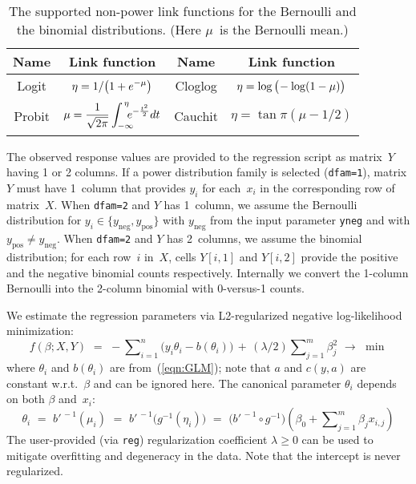 \begin{table}[t]\hfil
\begin{tabular}{|cc|cc|}
\hline
Name & Link function & Name & Link function \\
\hline
Logit   & $\displaystyle \eta = 1 / \big(1 + e^{-\mu}\big)^{\mathstrut}$ &
Cloglog & $\displaystyle \eta = \log \big(\!- \log(1 - \mu)\big)^{\mathstrut}$ \\
Probit  & $\displaystyle \mu  = \frac{1}{\sqrt{2\pi}}\int\nolimits_{-\infty_{\mathstrut}}^{\,\eta\mathstrut}
          \!\!\!\!\! e^{-\frac{t^2}{2}} dt$ & 
Cauchit & $\displaystyle \eta = \tan\pi(\mu - 1/2)$ \\
\hline
\end{tabular}\hfil
\caption{The supported non-power link functions for the Bernoulli and the binomial
distributions.  (Here $\mu$~is the Bernoulli mean.)}
\label{table:binomial_links}
\end{table}

The observed response values are provided to the regression script as matrix~$Y$
having 1 or 2 columns.  If a power distribution family is selected ({\tt dfam=1}),
matrix $Y$ must have 1~column that provides $y_i$ for each~$x_i$ in the corresponding
row of matrix~$X$.  When {\tt dfam=2} and $Y$ has 1~column, we assume the Bernoulli
distribution for $y_i\in\{y_{\mathrm{neg}}, y_{\mathrm{pos}}\}$ with $y_{\mathrm{neg}}$
from the input parameter {\tt yneg} and with $y_{\mathrm{pos}} \neq y_{\mathrm{neg}}$.  
When {\tt dfam=2} and $Y$ has 2~columns, we assume the
binomial distribution; for each row~$i$ in~$X$, cells $Y[i, 1]$ and $Y[i, 2]$ provide
the positive and the negative binomial counts respectively.  Internally we convert
the 1-column Bernoulli into the 2-column binomial with 0-versus-1 counts.

We estimate the regression parameters via L2-regularized negative log-likelihood
minimization:
\begin{equation*}
f(\beta; X, Y) \,\,=\,\, -\sum\nolimits_{i=1}^n \big(y_i\theta_i - b(\theta_i)\big)
\,+\,(\lambda/2) \sum\nolimits_{j=1}^m \beta_j^2\,\,\to\,\,\min
\end{equation*}
where $\theta_i$ and $b(\theta_i)$ are from~(\ref{eqn:GLM}); note that $a$
and $c(y, a)$ are constant w.r.t.~$\beta$ and can be ignored here.
The canonical parameter $\theta_i$ depends on both $\beta$ and~$x_i$:
\begin{equation*}
\theta_i \,\,=\,\, b'^{\,-1}(\mu_i) \,\,=\,\, b'^{\,-1}\big(g^{-1}(\eta_i)\big) \,\,=\,\,
\big(b'^{\,-1}\circ g^{-1}\big)\left(\beta_0 + \sum\nolimits_{j=1}^m \beta_j x_{i,j}\right)
\end{equation*}
The user-provided (via {\tt reg}) regularization coefficient $\lambda\geq 0$ can be used
to mitigate overfitting and degeneracy in the data.  Note that the intercept is never
regularized.

